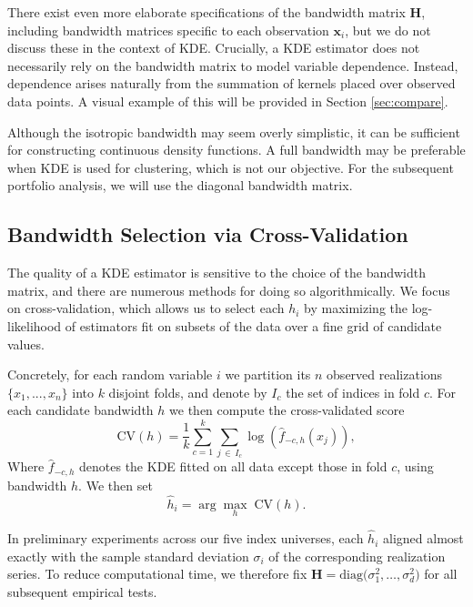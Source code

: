 There exist even more elaborate specifications of the bandwidth matrix $\mathbf{H}$, including bandwidth matrices specific to each observation $\mathbf{x}_i$, but we do not discuss these in the context of KDE. Crucially, a KDE estimator does not necessarily rely on the bandwidth matrix to model variable dependence. Instead, dependence arises naturally from the summation of kernels placed over observed data points. A visual example of this will be provided in Section \ref{sec:compare}.

Although the isotropic bandwidth may seem overly simplistic, it can be sufficient for constructing continuous density functions. A full bandwidth may be preferable when KDE is used for clustering, which is not our objective. For the subsequent portfolio analysis, we will use the diagonal bandwidth matrix.



\subsection{Bandwidth Selection via Cross-Validation}
\label{sec:crossval}
The quality of a KDE estimator is sensitive to the choice of the bandwidth matrix, and there are numerous methods for doing so algorithmically. We focus on cross-validation, which allows us to select each $h_i$ by maximizing the log-likelihood of estimators fit on subsets of the data over a fine grid of candidate values.

Concretely, for each random variable $i$ we partition its $n$ observed realizations $\{x_{1},...,x_{n}\}$ into $k$ disjoint folds, and denote by $I_{c}$ the set of indices in fold $c$. For each candidate bandwidth $h$ we then compute the cross-validated score
$$
\mathrm{CV}(h)=
\frac{1}{k}
\sum_{c=1}^{k}
\sum_{j \,\in\, I_c}
\log\left(\hat{f}_{-c,h}(x_j)\right),
$$
Where $\hat{f}_{-c,h}$ denotes the KDE fitted on all data except those in fold $c$, using bandwidth $h$. We then set
$$
\hat{h}_i = 
\arg\max_h\;\mathrm{CV}(h).
$$

In preliminary experiments across our five index universes, each $\hat{h}_i$ aligned almost exactly with the sample standard deviation $\sigma_i$ of the corresponding realization series. To reduce computational time, we therefore fix $\mathbf{H}=\mathrm{diag}\bigl(\sigma_{1}^{2}, \dots, \sigma_{d}^{2}\bigr)$ for all subsequent empirical tests.

